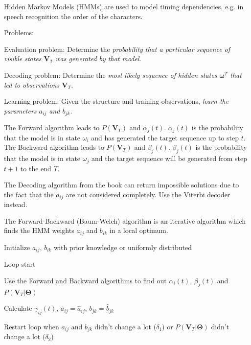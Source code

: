   \begin{minipage}{11cm}
    Hidden Markov Models (HMMs) are used to model timing dependencies, e.g.  
    in speech recognition the order of the characters.
    
    Problems:
    \begin{liste}
      \item Evaluation problem: Determine the \em probability \em that a particular sequence of 
      visible states $\bm V_T$ was generated by \em that model\em.
      \item Decoding problem: Determine the \em most likely sequence of hidden states \em $\bm \omega^T$ that
      led to observations $\bm V_T$.
      \item Learning problem: Given the structure and training observations, \em learn the parameters \em
      $a_{ij}$ and $b_{jk}$. 
    \end{liste}
    
      The Forward algorithm leads to $P(\bm V_T)$ and $\alpha_j(t)$. $\alpha_j(t)$ is the
      probability that the model is in state $\omega_i$ and has generated the target sequence up to step $t$.\\
      
      The Backward algorithm leads to $P(\bm V_T)$ and $\beta_j(t)$. $\beta_j(t)$ is the
      probability that the model is in state $\omega_j$ and the target sequence will be generated from step $t+1$ to the end $T$.
      
      
      The Decoding algorithm from the book can return impossible solutions due to the fact that
      the $a_{ij}$ are not considered completely. Use the Viterbi decoder instead.
    
      The Forward-Backward (Baum-Welch) algorithm is an iterative algorithm which finds the HMM 
      weights $a_{ij}$ and $b_{ik}$ in a local optimum.
      \begin{aufzaehlung}
        \item Initialize $a_{ij}$, $b_{ik}$ with prior knowledge or uniformly distributed
        \item Loop start
        \item Use the Forward and Backward algorithms to find out $\alpha_i(t)$, $\beta_j(t)$ and $P(\bm V_T|\bm \Theta)$
        \item Calculate $\gamma_{ij}(t)$, $a_{ij} = \hat a_{ij}$, $b_{jk} = \hat b_{jk}$
        \item Restart loop when $a_{ij}$ and $b_{jk}$ didn't change a lot ($\delta_1$) or 
        $P(\bm V_T|\bm \Theta)$ didn't change a lot ($\delta_2$)
      \end{aufzaehlung}
      
  \end{minipage}\hspace{5mm}
